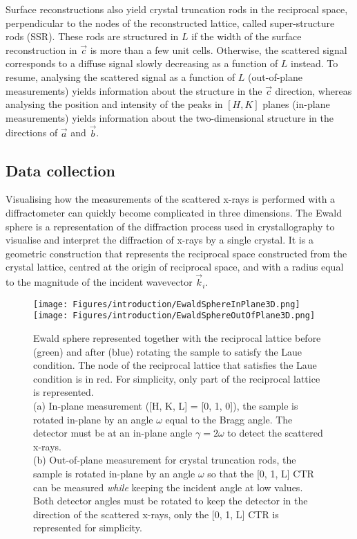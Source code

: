 Surface reconstructions also yield crystal truncation rods in the reciprocal space, perpendicular to the nodes of the reconstructed lattice, called super-structure rods (SSR).
These rods are structured in $L$ if the width of the surface reconstruction in $\vec{c}$ is more than a few unit cells.
Otherwise, the scattered signal corresponds to a diffuse signal slowly decreasing as a function of $L$ instead.
To resume, analysing the scattered signal as a function of $L$ (out-of-plane measurements) yields information about the structure in the $\vec{c}$ direction, whereas analysing the position and intensity of the peaks in $[H, K]$ planes (in-plane measurements) yields information about the two-dimensional structure in the directions of $\vec{a}$ and $\vec{b}$.

\subsection{Data collection} \label{sec:DataCollectionSXRD}

Visualising how the measurements of the scattered x-rays is performed with a diffractometer can quickly become complicated in three dimensions.
The Ewald sphere is a representation of the diffraction process used in crystallography to visualise and interpret the diffraction of x-rays by a single crystal.
It is a geometric construction that represents the reciprocal space constructed from  the crystal lattice, centred at the origin of reciprocal space, and with a radius equal to the magnitude of the incident wavevector $\vec{k}_i$.

\begin{figure}[!htb]
    \centering
    \texttt{[image: Figures/introduction/EwaldSphereInPlane3D.png]}
    \texttt{[image: Figures/introduction/EwaldSphereOutOfPlane3D.png]}
    \caption{
    Ewald sphere represented together with the reciprocal lattice before (green) and after (blue) rotating the sample to satisfy the Laue condition.
    The node of the reciprocal lattice that satisfies the Laue condition is in red.
    For simplicity, only part of the reciprocal lattice is represented.\\
    (a) In-plane measurement ([H, K, L] = [0, 1, 0]), the sample is rotated in-plane by an angle $\omega$ equal to the Bragg angle.
    The detector must be at an in-plane angle $\gamma=2\omega$ to detect the scattered x-rays.\\
    (b) Out-of-plane measurement for crystal truncation rods, the sample is rotated in-plane by an angle $\omega$ so that the [0, 1, L] CTR can be measured \textit{while} keeping the incident angle at low values.
    Both detector angles must be rotated to keep the detector in the direction of the scattered x-rays, only the [0, 1, L] CTR is represented for simplicity.
    }
    \label{fig:EwaldSphere}
\end{figure}

